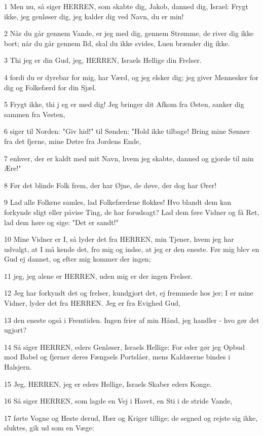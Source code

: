 \par 1 Men nu, så siger HERREN, som skabte dig, Jakob, danned dig, Israel: Frygt ikke, jeg genløser dig, jeg kalder dig ved Navn, du er min!
\par 2 Når du går gennem Vande, er jeg med dig, gennem Strømme, de river dig ikke bort; når du går gennem Ild, skal du ikke svides, Luen brænder dig ikke.
\par 3 Thi jeg er din Gud, jeg, HERREN, Israels Hellige din Frelser.
\par 4 fordi du er dyrebar for mig, har Værd, og jeg elsker dig; jeg giver Mennesker for dig og Folkefærd for din Sjæl.
\par 5 Frygt ikke, thi j eg er med dig! Jeg bringer dit Afkom fra Østen, sanker dig sammen fra Vesten,
\par 6 siger til Norden: "Giv hid!" til Sønden: "Hold ikke tilbage! Bring mine Sønner fra det fjerne, mine Døtre fra Jordens Ende,
\par 7 enhver, der er kaldt med mit Navn, hvem jeg skabte, danned og gjorde til min Ære!"
\par 8 Før det blinde Folk frem, der har Øjne, de døve, der dog har Ører!
\par 9 Lad alle Folkene samles, lad Folkefærdene flokkes! Hvo blandt dem kan forkynde sligt eller påvise Ting, de har forudsagt? Lad dem føre Vidner og få Ret, lad dem høre og sige: "Det er sandt!"
\par 10 Mine Vidner er I, så lyder det fra HERREN, min Tjener, hvem jeg har udvalgt, at I må kende det, fro mig og indse, at jeg er den eneste. Før mig blev en Gud ej dannet, og efter mig kommer der ingen;
\par 11 jeg, jeg alene er HERREN, uden mig er der ingen Frelser.
\par 12 Jeg har forkyndt det og frelser, kundgjort det, ej fremmede hos jer; I er mine Vidner, lyder det fra HERREN. Jeg er fra Evighed Gud,
\par 13 den eneste også i Fremtiden. Ingen frier af min Hånd, jeg handler - hvo gør det ugjort?
\par 14 Så siger HERREN, eders Genløser, Israels Hellige: For eder gør jeg Opbud mod Babel og fjerner deres Fængsels Portslåer, mens Kaldæerne bindes i Halsjern.
\par 15 Jeg, HERREN, jeg er eders Hellige, Israels Skaber eders Konge.
\par 16 Så siger HERREN, som lagde en Vej i Havet, en Sti i de stride Vande,
\par 17 førte Vogne og Heste derud, Hær og Kriger tillige; de segned og rejste sig ikke, sluktes, gik ud som en Væge:
